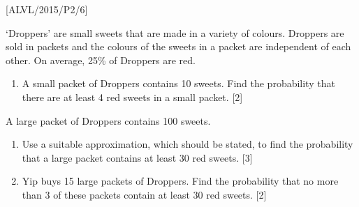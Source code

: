 \item {[}ALVL/2015/P2/6{]}

\textquoteleft Droppers\textquoteright{} are small sweets that are
made in a variety of colours. Droppers are sold in packets and the
colours of the sweets in a packet are independent of each other. On
average, 25\% of Droppers are red. 
\begin{enumerate}
\item A small packet of Droppers contains 10 sweets. Find the probability
that there are at least 4 red sweets in a small packet. \hfill{}{[}2{]}
\end{enumerate}
A large packet of Droppers contains 100 sweets. 
\begin{enumerate}
\item Use a suitable approximation, which should be stated, to find the
probability that a large packet contains at least 30 red sweets. \hfill{}{[}3{]}
\item Yip buys 15 large packets of Droppers. Find the probability that no
more than 3 of these packets contain at least 30 red sweets. \hfill{}{[}2{]}
\end{enumerate}
